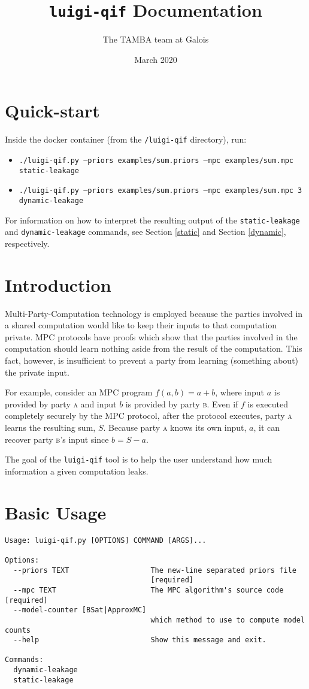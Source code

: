 \documentclass[11pt]{article}
\begin{document}
\title{\texttt{luigi-qif} Documentation}
\author{The TAMBA team at Galois}
\date{March 2020}
\maketitle

\section{Quick-start}
Inside the docker container (from the \texttt{/luigi-qif} directory), run:
{\footnotesize \begin{itemize}
    \item \texttt{./luigi-qif.py --priors examples/sum.priors --mpc examples/sum.mpc static-leakage}
    \item \texttt{./luigi-qif.py --priors examples/sum.priors --mpc examples/sum.mpc 3 dynamic-leakage}
\end{itemize}}

For information on how to interpret the resulting output of the \verb`static-leakage` and \verb`dynamic-leakage` commands, see Section \ref{static} and Section \ref{dynamic}, respectively.

\section{Introduction}
Multi-Party-Computation technology is employed because the parties involved in a shared computation would like to keep their inputs to that computation private. MPC protocols have proofs which show that the parties involved in the computation should learn nothing aside from the result of the computation. This fact, however, is insufficient to prevent a party from learning (something about) the private input.

For example, consider an MPC program $f(a, b) = a + b$, where input $a$ is provided by party \textsc{a} and input $b$ is provided by party \textsc{b}. Even if $f$ is executed completely securely by the MPC protocol, after the protocol executes, party \textsc{a} learns the resulting sum, $S$. Because party \textsc{a} knows its own input, $a$, it can recover party \textsc{b}'s input since $b = S - a$.

The goal of the \texttt{luigi-qif} tool is to help the user understand how much information a given computation leaks.

\section{Basic Usage}
\begin{verbatim}
Usage: luigi-qif.py [OPTIONS] COMMAND [ARGS]...

Options:
  --priors TEXT                   The new-line separated priors file
                                  [required]
  --mpc TEXT                      The MPC algorithm's source code  [required]
  --model-counter [BSat|ApproxMC]
                                  which method to use to compute model counts
  --help                          Show this message and exit.

Commands:
  dynamic-leakage
  static-leakage
\end{verbatim}
\end{document}
